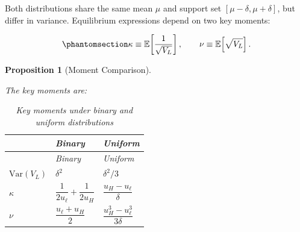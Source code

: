 \documentclass[
  english,
  a4paper,
  12pt]{article}
\newcommand{\E}{\mathbb{E}}
\newcommand{\Var}{\mathrm{Var}}
\theoremstyle{plain}
\newtheorem{proposition}{Proposition}[section]
\theoremstyle{plain}
\theoremstyle{definition}
\theoremstyle{remark}
\begin{document}
Both distributions share the same mean \(\mu\) and support set
\([\mu-\delta,\mu+\delta]\), but differ in variance. Equilibrium
expressions depend on two key moments:

\begin{equation}\phantomsection\label{eq-moments}{
\kappa \equiv \E\!\left[\frac{1}{\sqrt{V_L}}\right],
\qquad
\nu \equiv \E\!\left[\sqrt{V_L}\right].
}\end{equation}

\begin{proposition}[Moment
Comparison]\protect\hypertarget{prp-moments}{}\label{prp-moments}

The key moments are:

\begin{longtable}[]{@{}
  >{\raggedright\arraybackslash}p{}
  >{\raggedright\arraybackslash}p{}
  >{\raggedright\arraybackslash}p{}@{}}
\caption{Key moments under binary and uniform
distributions}\label{tbl-moments}\tabularnewline
\toprule\noalign{}
\begin{minipage}[b]{\linewidth}\raggedright
\end{minipage} & \begin{minipage}[b]{\linewidth}\raggedright
Binary
\end{minipage} & \begin{minipage}[b]{\linewidth}\raggedright
Uniform
\end{minipage} \\
\midrule\noalign{}
\endfirsthead
\toprule\noalign{}
\begin{minipage}[b]{\linewidth}\raggedright
\end{minipage} & \begin{minipage}[b]{\linewidth}\raggedright
Binary
\end{minipage} & \begin{minipage}[b]{\linewidth}\raggedright
Uniform
\end{minipage} \\
\midrule\noalign{}
\endhead
\bottomrule\noalign{}
\endlastfoot
\(\Var(V_L)\) & \(\delta^2\) & \(\delta^2/3\) \\
\(\kappa\) & \(\dfrac{1}{2u_\ell}+\dfrac{1}{2u_H}\) &
\(\dfrac{u_H-u_\ell}{\delta}\) \\
\(\nu\) & \(\dfrac{u_\ell+u_H}{2}\) &
\(\dfrac{u_H^3-u_\ell^3}{3\delta}\) \\
\end{longtable}

\end{proposition}
\end{document}
